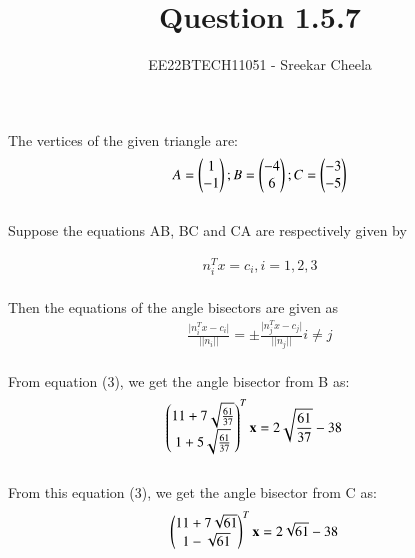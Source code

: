 \documentclass[journal,12pt,twocolumn]{IEEEtran}
\theoremstyle{remark}
\begin{document}
%




\vspace{3cm}

\title{
Question 1.5.7
}
\author{ EE22BTECH11051 - Sreekar Cheela 
}	

\maketitle

\newpage



\large The vertices of the given triangle are:
\\
\begin{align}
	A=\begin{pmatrix}1\\-1\end{pmatrix}; B=\begin{pmatrix}-4\\6\end{pmatrix}; C=\begin{pmatrix}-3\\-5\end{pmatrix}	
\end{align}
\\
Suppose the equations AB, BC and CA are respectively given by

 \large \begin{align}
    n_{i}^{T} x = c_i , i = 1,2,3
    \end{align}
\\
Then the equations of the angle bisectors are given as 
\\
\begin{align}
     \frac{\lvert n_{i}^{T} x - c_i  \rvert}{\lvert \lvert n_{i} \rvert \rvert} = \pm 
	 \frac{\lvert n_{j}^{T} x - c_j  \rvert}{\lvert \lvert n_{j} \rvert \rvert}
	 i \neq j
\end{align}
 \\
\bigskip 
 From equation (3), we get the angle bisector from B as:
\begin{align}
	&\begin{pmatrix}
        11 + 7\sqrt{\frac{61}{37}} \\
        1 + 5\sqrt{\frac{61}{37}}			
			\end{pmatrix}^{T}
			\mathbf {x} = 2\sqrt{\frac{61}{37}}-38
\end{align}   
\\
 From this equation (3), we get the angle bisector from C as:
\\
\begin{align}
	&\begin{pmatrix}
		11 + 7\sqrt{61} \\
    	1 - \sqrt{61}
		   \end{pmatrix}^{T}
		   \mathbf {x} = 2\sqrt{61}-38
\end{align}
\end{document}
